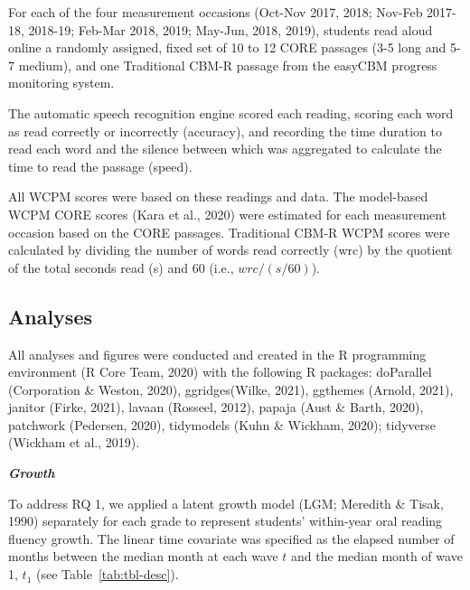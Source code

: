 \documentclass[
  english,
  man, fleqn, noextraspace]{apa6}
\begin{document}
For each of the four measurement occasions (Oct-Nov 2017, 2018; Nov-Feb 2017-18, 2018-19; Feb-Mar 2018, 2019; May-Jun, 2018, 2019), students read aloud online a randomly assigned, fixed set of 10 to 12 CORE passages (3-5 long and 5-7 medium), and one Traditional CBM-R passage from the easyCBM progress monitoring system.

The automatic speech recognition engine scored each reading, scoring each word as read correctly or incorrectly (accuracy), and recording the time duration to read each word and the silence between which was aggregated to calculate the time to read the passage (speed).

All WCPM scores were based on these readings and data. The model-based WCPM CORE scores (Kara et al., 2020) were estimated for each measurement occasion based on the CORE passages. Traditional CBM-R WCPM scores were calculated by dividing the number of words read correctly (wrc) by the quotient of the total seconds read (s) and 60 (i.e., \(wrc/(s/60)\)).

\hypertarget{analyses}{%
\subsection{Analyses}\label{analyses}}

All analyses and figures were conducted and created in the R programming environment (R Core Team, 2020) with the following R packages: doParallel (Corporation \& Weston, 2020), ggridges(Wilke, 2021), ggthemes (Arnold, 2021), janitor (Firke, 2021), lavaan (Rosseel, 2012), papaja (Aust \& Barth, 2020), patchwork (Pedersen, 2020), tidymodels (Kuhn \& Wickham, 2020); tidyverse (Wickham et al., 2019).

\textbf{\emph{Growth}}

To address RQ 1, we applied a latent growth model (LGM; Meredith \& Tisak, 1990) separately for each grade to represent students' within-year oral reading fluency growth. The linear time covariate was specified as the elapsed number of months between the median month at each wave \(t\) and the median month of wave 1, \(t_1\) (see Table~\ref{tab:tbl-desc}).
\end{document}
